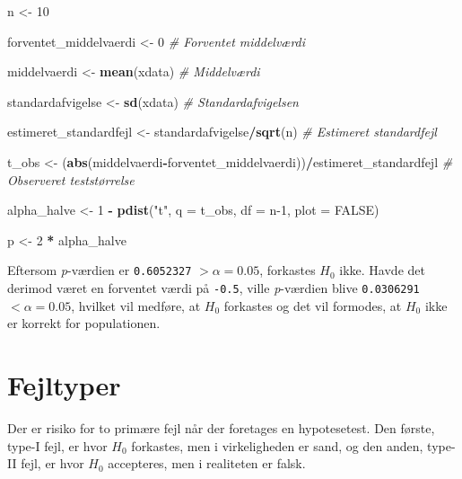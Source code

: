 \documentclass[
]{book}
\newenvironment{Shaded}{\begin{snugshade}}{\end{snugshade}}
\newcommand{\CommentTok}[1]{\textcolor[rgb]{0.56,0.35,0.01}{\textit{#1}}}
\newcommand{\DataTypeTok}[1]{\textcolor[rgb]{0.13,0.29,0.53}{#1}}
\newcommand{\DecValTok}[1]{\textcolor[rgb]{0.00,0.00,0.81}{#1}}
\newcommand{\KeywordTok}[1]{\textcolor[rgb]{0.13,0.29,0.53}{\textbf{#1}}}
\newcommand{\NormalTok}[1]{#1}
\newcommand{\OperatorTok}[1]{\textcolor[rgb]{0.81,0.36,0.00}{\textbf{#1}}}
\newcommand{\OtherTok}[1]{\textcolor[rgb]{0.56,0.35,0.01}{#1}}
\newcommand{\StringTok}[1]{\textcolor[rgb]{0.31,0.60,0.02}{#1}}
\theoremstyle{definition}
\theoremstyle{definition}
\theoremstyle{definition}
\theoremstyle{remark}
\begin{document}
\begin{Shaded}
\begin{Highlighting}[]
\NormalTok{n <-}\StringTok{ }\DecValTok{10}

\NormalTok{forventet_middelvaerdi <-}\StringTok{ }\DecValTok{0} \CommentTok{# Forventet middelværdi}

\NormalTok{middelvaerdi <-}\StringTok{ }\KeywordTok{mean}\NormalTok{(xdata) }\CommentTok{# Middelværdi}

\NormalTok{standardafvigelse <-}\StringTok{ }\KeywordTok{sd}\NormalTok{(xdata) }\CommentTok{# Standardafvigelsen}

\NormalTok{estimeret_standardfejl <-}\StringTok{ }\NormalTok{standardafvigelse}\OperatorTok{/}\KeywordTok{sqrt}\NormalTok{(n) }\CommentTok{# Estimeret standardfejl}

\NormalTok{t_obs <-}\StringTok{ }\NormalTok{(}\KeywordTok{abs}\NormalTok{(middelvaerdi}\OperatorTok{-}\NormalTok{forventet_middelvaerdi))}\OperatorTok{/}\NormalTok{estimeret_standardfejl}
  \CommentTok{# Observeret teststørrelse}

\NormalTok{alpha_halve <-}\StringTok{  }\DecValTok{1} \OperatorTok{-}\StringTok{ }\KeywordTok{pdist}\NormalTok{(}\StringTok{"t"}\NormalTok{, }\DataTypeTok{q =}\NormalTok{ t_obs, }\DataTypeTok{df =}\NormalTok{ n}\DecValTok{-1}\NormalTok{, }\DataTypeTok{plot =} \OtherTok{FALSE}\NormalTok{)}

\NormalTok{p <-}\StringTok{ }\DecValTok{2} \OperatorTok{*}\StringTok{ }\NormalTok{alpha_halve}
\end{Highlighting}
\end{Shaded}

Eftersom \emph{p}-værdien er \texttt{0.6052327} \(> \alpha=0.05\), forkastes \(H_0\) ikke. Havde det derimod været en forventet værdi på \texttt{-0.5}, ville \emph{p}-værdien blive \texttt{0.0306291} \(< \alpha=0.05\), hvilket vil medføre, at \(H_0\) forkastes og det vil formodes, at \(H_0\) ikke er korrekt for populationen.

\hypertarget{fejltyper}{%
\section{Fejltyper}\label{fejltyper}}

Der er risiko for to primære fejl når der foretages en hypotesetest. Den første, type-I fejl, er hvor \(H_0\) forkastes, men i virkeligheden er sand, og den anden, type-II fejl, er hvor \(H_0\) accepteres, men i realiteten er falsk.
\end{document}
